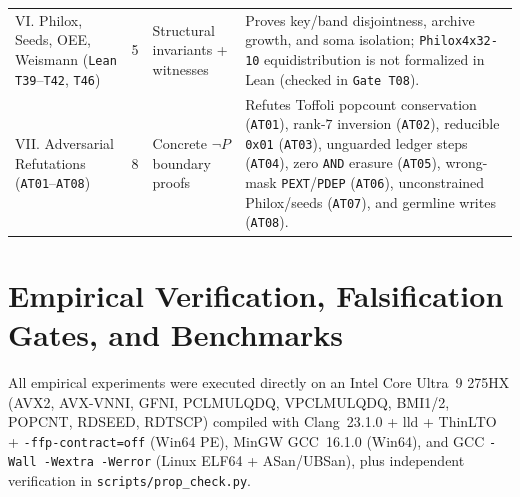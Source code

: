 \documentclass[11pt,reqno]{amsart}
\theoremstyle{plain}
\theoremstyle{definition}
\theoremstyle{remark}
\newcommand{\code}[1]{{\footnotesize\nolinkurl{#1}}}
\newcommand{\tcode}[1]{{\scriptsize\nolinkurl{#1}}}
\begin{document}
\begin{table}[t]
\begin{tabularx}{\textwidth}{@{}P{2.65cm}P{0.55cm}P{2.60cm}Y@{}}
VI. Philox, Seeds, OEE, Weismann (\tcode{Lean T39}--\tcode{T42}, \tcode{T46}) & 5 & Structural invariants + witnesses & Proves key/band disjointness, archive growth, and soma isolation; \tcode{Philox4x32-10} equidistribution is not formalized in Lean (checked in \tcode{Gate T08}). \\
VII. Adversarial Refutations (\tcode{AT01}--\tcode{AT08}) & 8 & Concrete $\neg P$ boundary proofs & Refutes Toffoli popcount conservation (\tcode{AT01}), rank-$7$ inversion (\tcode{AT02}), reducible \tcode{0x01} (\tcode{AT03}), unguarded ledger steps (\tcode{AT04}), zero \tcode{AND} erasure (\tcode{AT05}), wrong-mask \tcode{PEXT}/\tcode{PDEP} (\tcode{AT06}), unconstrained Philox/seeds (\tcode{AT07}), and germline writes (\tcode{AT08}). \\
\bottomrule
\end{tabularx}
\end{table}

\section{Empirical Verification, Falsification Gates, and Benchmarks}
\label{sec:empirical}

All empirical experiments were executed directly on an Intel Core Ultra~9 275HX (AVX2, AVX-VNNI, GFNI, PCLMULQDQ, VPCLMULQDQ, BMI1/2, POPCNT, RDSEED, RDTSCP) compiled with Clang~23.1.0 + lld + ThinLTO + \code{-ffp-contract=off} (Win64 PE), MinGW GCC~16.1.0 (Win64), and GCC \code{-Wall -Wextra -Werror} (Linux ELF64 + ASan/UBSan), plus independent verification in \code{scripts/prop_check.py}.
\end{document}
